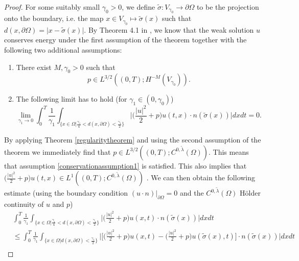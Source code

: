 \documentclass[12pt,a4paper]{article}
\theoremstyle{definition}
\theoremstyle{remark}
\numberwithin{equation}{section}
\begin{document}
\begin{proof}
For some suitably small $\gamma_0 > 0$, we define $\widetilde{\sigma} : V_{\gamma_0} \rightarrow \partial \Omega$ to be the projection onto the boundary, i.e. the map $x \in V_{\gamma_0} \mapsto \widetilde{\sigma} (x)$ such that $d(x, \partial \Omega) = \lvert x - \widetilde{\sigma} (x) \rvert$. By Theorem 4.1 in \cite{titi2019}, we know that the weak solution $u$ conserves energy under the first assumption of the theorem together with the following two additional assumptions:
\begin{enumerate}
    \item There exist $M, \gamma_0 > 0$ such that
    \begin{equation} \label{conservationassumption1}
    p \in L^{3/2} ((0,T); H^{-M} (V_{\gamma_0})).
    \end{equation}
    \item The following limit has to hold (for $\gamma_1 \in (0, \gamma_0)$)
    \begin{equation} \label{conservationassumption2}
    \lim_{\gamma_1 \rightarrow 0} \int_0^T \frac{1}{\gamma_1} \int_{\big\{ x \in \Omega \big\lvert \frac{\gamma_1}{4} < d(x, \partial \Omega) < \frac{\gamma_1}{2} \big\}} \bigg\lvert \bigg( \frac{\lvert u \rvert^2}{2} + p \bigg) u(t,x) \cdot n (\widetilde{\sigma}(x)) \bigg\rvert dx dt = 0.
    \end{equation}
\end{enumerate}
By applying Theorem \ref{regularitytheorem} and using the second assumption of the theorem we immediately find that $p \in L^{3/2} ((0,T); C^{0,\widetilde{\lambda}} (\Omega))$. This means that assumption \eqref{conservationassumption1} is satisfied. This also implies that $\bigg( \frac{\lvert u \rvert^2}{2} + p \bigg) u(t,x) \in L^1 ((0,T); C^{0,\widetilde{\lambda}} (\Omega))$ . We can then obtain the following estimate (using the boundary condition $(u \cdot n) \lvert_{\partial \Omega} = 0$ and the $C^{0,\widetilde{\lambda}} (\Omega)$ Hölder continuity of $u$ and $p$)
\begin{align*}
&\int_0^T \frac{1}{\gamma_1} \int_{\big\{ x \in \Omega \big\lvert \frac{\gamma_1}{4} < d(x, \partial \Omega) < \frac{\gamma_1}{2} \big\}} \bigg\lvert \bigg( \frac{\lvert u \rvert^2}{2} + p \bigg) u(x,t) \cdot n (\widetilde{\sigma}(x)) \bigg\rvert dx dt \\
&\leq \int_0^T \frac{1}{\gamma_1} \int_{\big\{ x \in \Omega \big\lvert d(x, \partial \Omega) < \frac{\gamma_1}{2} \big\}} \bigg\lvert \bigg[ \bigg( \frac{\lvert u \rvert^2}{2} + p \bigg) u(x,t) - \bigg( \frac{\lvert u \rvert^2}{2} + p \bigg) u(\widetilde{\sigma} (x),t) \bigg] \cdot n (\widetilde{\sigma}(x)) \bigg\rvert dx dt \\

\end{align*}
\end{proof}
\end{document}

